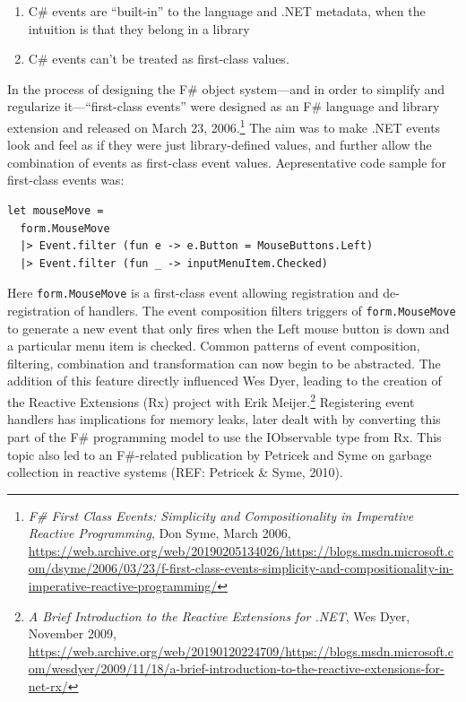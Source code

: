 \documentclass[acmsmall]{acmart}\settopmatter{}
\begin{document}
\begin{enumerate}
\item C\# events are “built-in” to the language and .NET metadata, when the intuition is that they belong in a library
\item C\# events can’t be treated as first-class values.  
\end{enumerate}

In the process of designing the F\# object system---and in order to simplify and regularize it---“first-class events” were designed as an F\# language and library extension and released on March 23, 2006.\footnote{\textit{F\# First Class Events: Simplicity and Compositionality in Imperative Reactive Programming}, Don Syme, March 2006,  \url{https://web.archive.org/web/20190205134026/https://blogs.msdn.microsoft.com/dsyme/2006/03/23/f-first-class-events-simplicity-and-compositionality-in-imperative-reactive-programming/}}  The aim was to make .NET events look and feel as if they were just library-defined values, and further allow the combination of events as first-class event values. Aepresentative code sample for first-class events was:

\begin{verbatim}
let mouseMove = 
  form.MouseMove 
  |> Event.filter (fun e -> e.Button = MouseButtons.Left)
  |> Event.filter (fun _ -> inputMenuItem.Checked)
\end{verbatim}

Here \texttt{form.MouseMove} is a first-class event allowing registration and de-registration of handlers.  The event composition filters triggers of \texttt{form.MouseMove} to generate a new event that only fires when the Left mouse button is down and a particular menu item is checked.  Common patterns of event composition, filtering, combination and transformation can now begin to be abstracted.  The addition of this feature directly influenced Wes Dyer, leading to the creation of the Reactive Extensions (Rx) project with Erik Meijer.\footnote{\textit{A Brief Introduction to the Reactive Extensions for .NET}, Wes Dyer, November 2009, \url{https://web.archive.org/web/20190120224709/https://blogs.msdn.microsoft.com/wesdyer/2009/11/18/a-brief-introduction-to-the-reactive-extensions-for-net-rx/}}  Registering event handlers has implications for memory leaks, later dealt with by converting this part of the F\# programming model to use the IObservable type from Rx.  This topic also led to an F\#-related publication by Petricek and Syme on garbage collection in reactive systems (REF: Petricek \& Syme, 2010).
\end{document}
